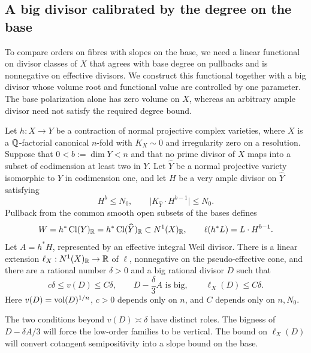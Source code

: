 \subsection{A big divisor calibrated by the degree on the base}
\label{subsec:rank:calibration}

To compare orders on fibres with slopes on the base, we need a linear
functional on divisor classes of $X$ that agrees with base degree on
pullbacks and is nonnegative on effective divisors.  We construct this
functional together with a big divisor whose volume root and functional
value are controlled by one parameter.  The base polarization alone has
zero volume on $X$, whereas an arbitrary ample divisor need not satisfy
the required degree bound.

\begin{lemma}[Calibration]\label{lem:rank:calibration}
Let $h:X\to Y$ be a contraction of normal projective complex varieties,
where $X$ is a $\mathbb Q$-factorial canonical $n$-fold with $K_X\sim0$ and
irregularity zero on a resolution.  Suppose that $0<b:=\dim Y<n$ and
that no prime divisor of $X$ maps into a subset of codimension at least
two in $Y$.  Let $\widehat Y$ be a normal projective variety isomorphic
to $Y$ in codimension one, and let $H$ be a very ample divisor on
$\widehat Y$ satisfying
\[
 H^b\le N_0,
 \qquad
 \bigl|K_{\widehat Y}\cdot H^{b-1}\bigr|\le N_0.
\]
Pullback from the common smooth open subsets of the bases defines
\[
 W=h^*\operatorname{Cl}(Y)_{\mathbb R}
   =h^*\operatorname{Cl}(\widehat Y)_{\mathbb R}
   \subset N^1(X)_{\mathbb R},
 \qquad
 \ell(h^*L)=L\cdot H^{b-1}.
\]
Let $A=h^*H$, represented by an effective integral Weil divisor.
There is a linear extension
$\ell_X:N^1(X)_{\mathbb R}\to\mathbb R$ of $\ell$, nonnegative on the
pseudo-effective cone, and there are a rational number $\delta>0$ and
a big rational divisor $D$ such that
\begin{equation}\label{eq:rank:calibration}
 c\delta\le v(D)\le C\delta,
 \qquad
 D-\frac{\delta}{3}A\text{ is big},
 \qquad
 \ell_X(D)\le C\delta.
\end{equation}
Here $v(D)=\operatorname{vol}(D)^{1/n}$, $c>0$ depends only on $n$, and $C$ depends
only on $n,N_0$.
\end{lemma}

The two conditions beyond $v(D)\asymp\delta$ have distinct roles.
The bigness of $D-\delta A/3$ will force the low-order families to be
vertical.  The bound on $\ell_X(D)$ will convert cotangent
semipositivity into a slope bound on the base.

